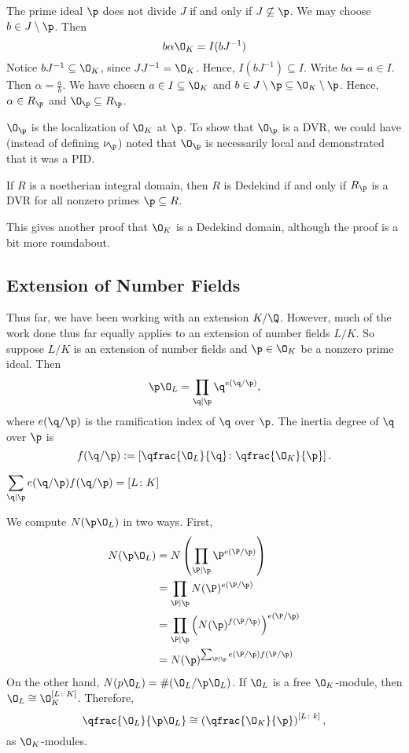 The prime ideal $\p$ does not divide $J$ if and only if $J \not\subseteq \p$. We may choose $b \in J \setminus \p$. Then
	\[
	b\alpha \O_K= I(bJ^{-1})
	\]
Notice $bJ^{-1} \subseteq \O_K$, since $JJ^{-1}=\O_K$. Hence, $I(bJ^{-1}) \subseteq I$. Write $b\alpha=a \in I$. Then $\alpha= \frac{a}{b}$. We have chosen $a \in I \subseteq \O_K$ and $b \in J \setminus \p \subseteq \O_K \setminus \p$. Hence, $\alpha \in R_\p$ and $\O_\p \subseteq R_\p$. 

\begin{rem}
$\O_\p$ is the localization of $\O_K$ at $\p$. To show that $\O_\p$ is a DVR, we could have (instead of defining $\nu_\p$) noted that $\O_\p$ is necessarily local and demonstrated that it was a PID.
\end{rem}

\begin{thm}
If $R$ is a noetherian integral domain, then $R$ is Dedekind if and only if $R_\p$ is a DVR for all nonzero primes $\p \subseteq R$. 
\end{thm}

This gives another proof that $\O_K$ is a Dedekind domain, although the proof is a bit more roundabout. 



\subsection{Extension of Number Fields}

Thus far, we have been working with an extension $K/\Q$. However, much of the work done thus far equally applies to an extension of number fields $L/K$. So suppose $L/K$ is an extension of number fields and $\p \in \O_K$ be a nonzero prime ideal. Then
	\[
	\p \O_L = \prod_{\q \mid \p} \q^{e(\q/\p)},
	\]
where $e(\q/\p)$ is the ramification index of $\q$ over $\p$. The inertia degree of $\q$ over $\p$ is
	\[
	f(\q/\p):= \left[\qfrac{\O_L}{\q} \colon \qfrac{\O_K}{\p} \right].
	\]

\begin{thm}
$\displaystyle \sum_{\q \mid \p} e(\q/\p) f(\q/\p)=[L \colon K]$
\end{thm}

\pf We compute $N(\p \O_L)$ in two ways. First, 
	\[
	\begin{split}
	N(\p\O_L)&= N\left(\prod_{\P \mid \p} \P^{e(\P/\p)} \right) \\
	&= \prod_{\P \mid \p} N(\P)^{e(\P/\p)} \\
	&= \prod_{\P \mid \p} \left( N(\p)^{f(\P/\p)} \right)^{e(\P/\p)} \\
	&= N(\p)^{\sum_{\P \mid \p} e(\P/\p) f(\P/\p)}
	\end{split}
	\]
On the other hand, $N(p\O_L)=\#(\O_L/\p\O_L)$. If $\O_L$ is a free $\O_K$-module, then $\O_L \cong \O_K^{[L \colon K]}$. Therefore,
	\[
	\qfrac{\O_L}{\p \O_L} \cong \left(\qfrac{\O_K}{\p}\right)^{[L \colon k]},
	\] 
as $\O_K$-modules.

